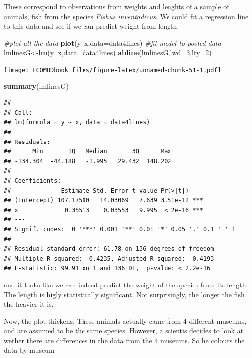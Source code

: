 \documentclass[
]{book}
\newenvironment{Shaded}{\begin{snugshade}}{\end{snugshade}}
\newcommand{\CommentTok}[1]{\textcolor[rgb]{0.56,0.35,0.01}{\textit{#1}}}
\newcommand{\DataTypeTok}[1]{\textcolor[rgb]{0.13,0.29,0.53}{#1}}
\newcommand{\DecValTok}[1]{\textcolor[rgb]{0.00,0.00,0.81}{#1}}
\newcommand{\KeywordTok}[1]{\textcolor[rgb]{0.13,0.29,0.53}{\textbf{#1}}}
\newcommand{\NormalTok}[1]{#1}
\newcommand{\OperatorTok}[1]{\textcolor[rgb]{0.81,0.36,0.00}{\textbf{#1}}}
\begin{document}
These correspond to observations from weights and lenghts of a sample of animals, fish from the species \emph{Fishus inventadicus}. We could fit a regression line to this data and see if we can predict weight from length

\begin{Shaded}
\begin{Highlighting}[]
\CommentTok{#plot all the data}
\KeywordTok{plot}\NormalTok{(y}\OperatorTok{~}\NormalTok{x,}\DataTypeTok{data=}\NormalTok{data4lines)}
\CommentTok{#fit model to pooled data}
\NormalTok{lmlinesG<-}\KeywordTok{lm}\NormalTok{(y}\OperatorTok{~}\NormalTok{x,}\DataTypeTok{data=}\NormalTok{data4lines)}
\KeywordTok{abline}\NormalTok{(lmlinesG,}\DataTypeTok{lwd=}\DecValTok{3}\NormalTok{,}\DataTypeTok{lty=}\DecValTok{2}\NormalTok{)}
\end{Highlighting}
\end{Shaded}

\texttt{[image: ECOMODbook\_files/figure-latex/unnamed-chunk-51-1.pdf]}

\begin{Shaded}
\begin{Highlighting}[]
\KeywordTok{summary}\NormalTok{(lmlinesG)}
\end{Highlighting}
\end{Shaded}

\begin{verbatim}
## 
## Call:
## lm(formula = y ~ x, data = data4lines)
## 
## Residuals:
##      Min       1Q   Median       3Q      Max 
## -134.304  -44.188   -1.995   29.432  148.202 
## 
## Coefficients:
##              Estimate Std. Error t value Pr(>|t|)    
## (Intercept) 107.17590   14.03069   7.639 3.51e-12 ***
## x             0.35513    0.03553   9.995  < 2e-16 ***
## ---
## Signif. codes:  0 '***' 0.001 '**' 0.01 '*' 0.05 '.' 0.1 ' ' 1
## 
## Residual standard error: 61.78 on 136 degrees of freedom
## Multiple R-squared:  0.4235,	Adjusted R-squared:  0.4193 
## F-statistic: 99.91 on 1 and 136 DF,  p-value: < 2.2e-16
\end{verbatim}

and it looks like we can indeed predict the weight of the species from its length. The length is higly statistically significant. Not surprisingly, the longer the fish the heavier it is.

Now, the plot thickens. These animals actually came from 4 different museums, and are assumed to be the same species. However, a scientis decides to look at wether there are differences in the data from the 4 museums. So he colours the data by museum
\end{document}
